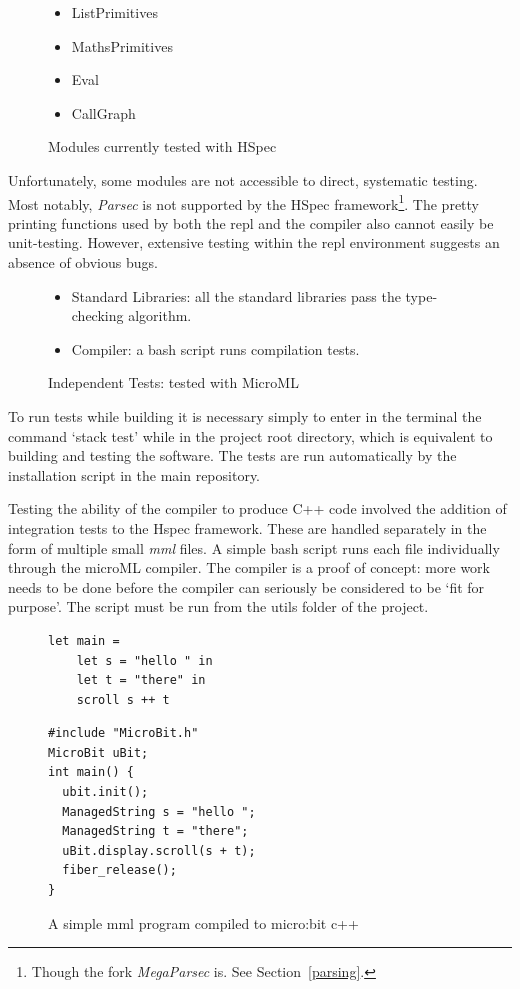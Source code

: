 \documentclass[12pt, a4paper]{report}
\begin{document}
\begin{figure}
    \begin{itemize}
        \item ListPrimitives
        \item MathsPrimitives
        \item Eval
        \item CallGraph
    \end{itemize}
    \caption{Modules currently tested with HSpec}
\label{fig:hspec}
\end{figure}

Unfortunately, some modules are not accessible to direct, systematic testing. Most notably,
\textit{Parsec} is not supported by the HSpec framework\footnote{Though the fork
\textit{MegaParsec} is. See Section~\ref{parsing}.}. The pretty printing functions used by both the
repl and the compiler also cannot easily be unit-testing. However, extensive testing within the repl
environment suggests an absence of obvious bugs.

\begin{figure}[H]
    \begin{itemize}
        \item Standard Libraries: all the standard libraries pass the type-checking algorithm.
        \item Compiler: a bash script runs compilation tests.
    \end{itemize}
    \caption{Independent Tests: tested with MicroML}
\label{fig:indtests}
\end{figure}

To run tests while building it is necessary simply to enter in the terminal the command `stack test'
while in the project root directory, which is equivalent to building and testing the
software. The tests are run automatically by the installation script in the main repository.

Testing the ability of the compiler to produce C++ code involved the addition of integration tests
to the Hspec framework. These are handled separately in the form of multiple small \textit{mml}
files. A simple bash script runs each file individually through the microML compiler. The compiler
is a proof of concept: more work needs to be done before the compiler can seriously be considered to
be `fit for purpose'. The script must be run from the utils folder of the project.

\begin{figure}
    \begin{verbatim}
let main =
    let s = "hello " in
    let t = "there" in
    scroll s ++ t
    \end{verbatim}
    \begin{verbatim}
#include "MicroBit.h"
MicroBit uBit;
int main() {
  ubit.init();
  ManagedString s = "hello ";
  ManagedString t = "there";
  uBit.display.scroll(s + t);
  fiber_release();
}
    \end{verbatim}
    \caption{A simple mml program compiled to micro:bit c++}
\label{fig:compiler}
\end{figure}
\end{document}
